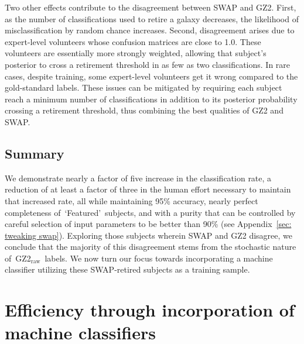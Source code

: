 \documentclass[twocolumn,  trackchanges, ]{aastex6}%
\newcommand{\feat}{`Featured'}
\newcommand{\raw}{GZ2$_{\text{raw}}$}
\begin{document}
Two other effects contribute to the disagreement between SWAP and GZ2. First, as the number of classifications used to retire a galaxy decreases, the likelihood of misclassification by random chance increases. Second, disagreement arises due to expert-level volunteers whose confusion matrices are close to 1.0. These volunteers are essentially more strongly weighted, allowing that subject's posterior to cross a retirement threshold in as few as two classifications. In rare cases, despite training, some expert-level 
volunteers get it wrong compared to the gold-standard labels. These issues can be mitigated by requiring each subject reach a minimum number of classifications in addition to its posterior probability crossing a retirement threshold, thus combining the best qualities of GZ2 and SWAP. 


\subsection{Summary}
We demonstrate nearly a factor of five increase in the classification rate, a reduction of at least a factor of three in the human effort necessary to maintain that increased rate, all while maintaining 95\% accuracy, nearly perfect completeness of~\feat~subjects, and with a purity that can be controlled by careful selection of input parameters to be better than 90\% (see Appendix~\ref{sec: tweaking swap}). Exploring those subjects wherein SWAP and GZ2 disagree, we conclude that the majority of this disagreement stems from the stochastic nature of~\raw~labels. We now turn our focus towards incorporating a machine classifier utilizing these SWAP-retired subjects as a training sample. 


\section{Efficiency through incorporation of machine classifiers} \label{sec: machine}
\end{document}
